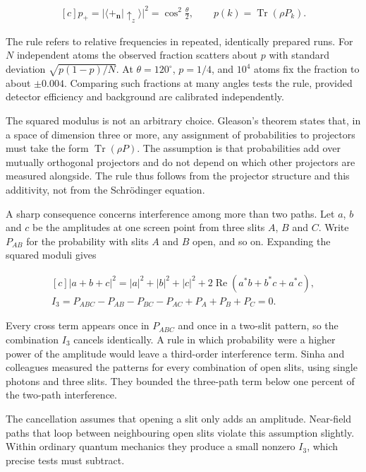 \documentclass[11pt,oneside]{book}
\newenvironment{centeredalign}{\[\begin{gathered}[c]}{\end{gathered}\]}
\begin{document}
\begin{centeredalign}
p_+=|\langle{+_{\mathbf n}}|{\uparrow_z}\rangle|^2=\cos^2\frac{\theta}{2},\qquad
p(k)=\operatorname{Tr}(\rho P_k).
\end{centeredalign}

The rule refers to relative frequencies in repeated, identically prepared runs. For \(N\) independent atoms the observed fraction scatters about \(p\) with standard deviation \(\sqrt{p(1-p)/N}\). At \(\theta=120^\circ\), \(p=1/4\), and \(10^4\) atoms fix the fraction to about \(\pm0.004\). Comparing such fractions at many angles tests the rule, provided detector efficiency and background are calibrated independently.

The squared modulus is not an arbitrary choice. Gleason's theorem states that, in a space of dimension three or more, any assignment of probabilities to projectors must take the form \(\operatorname{Tr}(\rho P)\). The assumption is that probabilities add over mutually orthogonal projectors and do not depend on which other projectors are measured alongside. The rule thus follows from the projector structure and this additivity, not from the Schrödinger equation.

A sharp consequence concerns interference among more than two paths. Let \(a\), \(b\) and \(c\) be the amplitudes at one screen point from three slits \(A\), \(B\) and \(C\). Write \(P_{AB}\) for the probability with slits \(A\) and \(B\) open, and so on. Expanding the squared moduli gives

\begin{centeredalign}
|a+b+c|^2=|a|^2+|b|^2+|c|^2+2\operatorname{Re}(a^*b+b^*c+a^*c),\\
I_3=P_{ABC}-P_{AB}-P_{BC}-P_{AC}+P_A+P_B+P_C=0.
\end{centeredalign}

Every cross term appears once in \(P_{ABC}\) and once in a two-slit pattern, so the combination \(I_3\) cancels identically. A rule in which probability were a higher power of the amplitude would leave a third-order interference term. Sinha and colleagues measured the patterns for every combination of open slits, using single photons and three slits. They bounded the three-path term below one percent of the two-path interference.

The cancellation assumes that opening a slit only adds an amplitude. Near-field paths that loop between neighbouring open slits violate this assumption slightly. Within ordinary quantum mechanics they produce a small nonzero \(I_3\), which precise tests must subtract.
\end{document}
